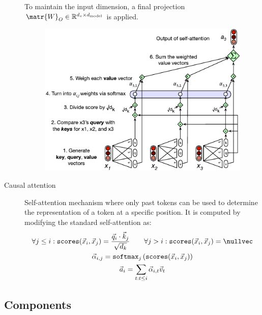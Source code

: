 \begin{description}
        To maintain the input dimension, a final projection $\matr{W}_O \in \mathbb{R}^{d_v \times d_\text{model}}$ is applied.

        \begin{figure}[H]
            \centering
            \includegraphics[width=0.6\linewidth]{./img/_self_attention.pdf}
        \end{figure}


    \item[Causal attention] 
        Self-attention mechanism where only past tokens can be used to determine the representation of a token at a specific position. It is computed by modifying the standard self-attention as:
        \[
            \begin{gathered}
                \forall j \leq i: \texttt{scores}(\vec{x}_i, \vec{x}_j) = \frac{\vec{q}_i \cdot \vec{k}_j}{\sqrt{d_k}} \qquad
                \forall j > i: \texttt{scores}(\vec{x}_i, \vec{x}_j) = \nullvec \\
                \vec{\alpha}_{i,j} = \texttt{softmax}_j\left( \texttt{scores}(\vec{x}_i, \vec{x}_j) \right) \\
                \vec{a}_i = \sum_{t: t \leq i} \vec{\alpha}_{i,t} \vec{v}_t
            \end{gathered}
        \]
\end{description}


\subsection{Components}

